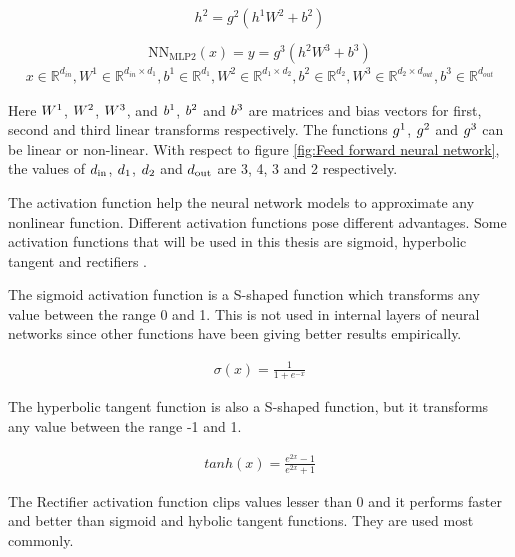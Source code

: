 \documentclass[a4paper, 11pt]{article}
\newcommand{\R}{\mathbb{R}}
\begin{document}
\begin{equation}
h^2 = g^2(h^1W^2 + b^2)
\end{equation}

\begin{equation} \label{equ: feed forward output layer}
\mathrm{NN_{MLP2}}(x) = y = g^3(h^2W^3 + b^3)
\end{equation}
\begin{align*}
x \in \R^{d_{in}}, W^1 \in \R^{d_{in} \times d_1}, b^1 \in \R^{d_1}, W^2 \in \R^{d_1 \times d_2}, b^2 \in \R^{d_2}, W^3 \in \R^{d_2 \times d_{out}}, b^3 \in \R^{d_{out}}
\end{align*}

Here $W\textsuperscript{1}$, $W\textsuperscript{2}$, $W\textsuperscript{3}$,  and $b\textsuperscript{1}$, $b\textsuperscript{2}$ and $b\textsuperscript{3}$ are matrices and bias vectors for first, second and third linear transforms respectively. The functions $g\textsuperscript{1}$, $g\textsuperscript{2}$ and $g\textsuperscript{3}$ can be linear or non-linear. With respect to figure \ref{fig:Feed forward neural network}, the values of $d\textsubscript{in}$, $d\textsubscript{1}$, $d\textsubscript{2}$ and $d\textsubscript{out}$ are 3, 4, 3 and 2 respectively. 

The activation function help the neural network models to approximate any nonlinear function. Different activation functions pose different advantages. Some activation functions that will be used in this thesis are sigmoid, hyperbolic tangent and rectifiers \cite{Goldberg2016}.

The sigmoid activation function is a S-shaped function which transforms any value between the range 0 and 1. This is not used in internal layers of neural networks since other functions have been giving better results empirically. 

\begin{align*}
\sigma (x) = \frac{1}{1 + e^{-x}}
\end{align*} 

The hyperbolic tangent function is also a S-shaped function, but it transforms any value between the range -1 and 1.

\begin{align*}
tanh(x) = \frac{e^{2x}-1}{e^{2x}+1}
\end{align*}

The Rectifier activation function clips values lesser than 0 and it performs faster and better than sigmoid and hybolic tangent functions. They are used most commonly.
\end{document}
